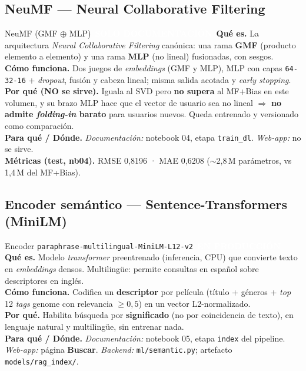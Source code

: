 \documentclass[11pt,a4paper]{article}
\newcommand{\code}[1]{\textcolor{omnidark}{\texttt{#1}}}
\newcommand{\enprod}{\textcolor{white}{\colorbox{omniaccent}{\scriptsize\bfseries\,EN PRODUCCIÓN\,}}}
\newcommand{\noserv}{\textcolor{white}{\colorbox{omnigray}{\scriptsize\bfseries\,SOLO DOCUMENTACIÓN\,}}}
\begin{document}
\subsection{NeuMF — Neural Collaborative Filtering}
\begin{modelcard}{NeuMF (GMF $\oplus$ MLP) \hfill \noserv}
\textbf{Qué es.} La arquitectura \textit{Neural Collaborative Filtering} canónica: una rama \textbf{GMF} (producto elemento a elemento) y una rama \textbf{MLP} (no lineal) fusionadas, con sesgos.\\[3pt]
\textbf{Cómo funciona.} Dos juegos de \textit{embeddings} (GMF y MLP), MLP con capas \code{64-32-16} + \textit{dropout}, fusión y cabeza lineal; misma salida acotada y \textit{early stopping}.\\[3pt]
\textbf{Por qué (NO se sirve).} Iguala al SVD pero \textbf{no supera} al MF+Bias en este volumen, y su brazo MLP hace que el vector de usuario sea no lineal $\Rightarrow$ \textbf{no admite \textit{folding-in} barato} para usuarios nuevos. Queda entrenado y versionado como comparación.\\[3pt]
\textbf{Para qué / Dónde.} \emph{Documentación:} notebook 04, etapa \code{train\_dl}. \emph{Web-app:} no se sirve.\\[3pt]
\textbf{Métricas (test, nb04).} RMSE 0,8196 · MAE 0,6208 ($\sim$2,8\,M parámetros, vs 1,4\,M del MF+Bias).
\end{modelcard}

\subsection{Encoder semántico — Sentence-Transformers (MiniLM)}
\begin{modelcard}{Encoder \texttt{paraphrase-multilingual-MiniLM-L12-v2} \hfill \enprod}
\textbf{Qué es.} Modelo \textit{transformer} preentrenado (inferencia, CPU) que convierte texto en \textit{embeddings} densos. Multilingüe: permite consultas en español sobre descriptores en inglés.\\[3pt]
\textbf{Cómo funciona.} Codifica un \textbf{descriptor} por película (título + géneros + \textit{top} 12 \textit{tags} genome con relevancia $\geq 0{,}5$) en un vector L2-normalizado.\\[3pt]
\textbf{Por qué.} Habilita búsqueda por \textbf{significado} (no por coincidencia de texto), en lenguaje natural y multilingüe, sin entrenar nada.\\[3pt]
\textbf{Para qué / Dónde.} \emph{Documentación:} notebook 05, etapa \code{index} del pipeline. \emph{Web-app:} página \textbf{Buscar}. \emph{Backend:} \code{ml/semantic.py}; artefacto \code{models/rag\_index/}.
\end{modelcard}
\end{document}
